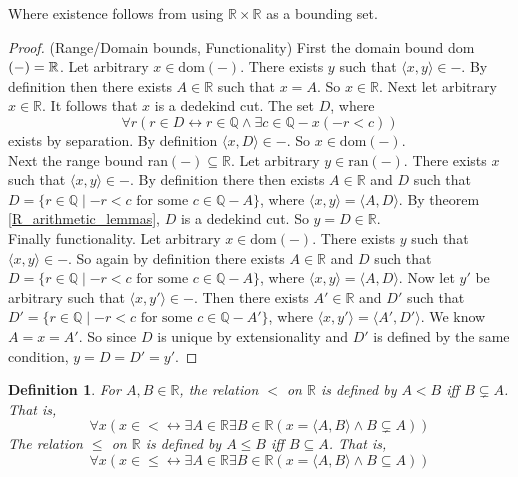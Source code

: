 \documentclass{report}
\newtheorem{definition}[theo]{Definition}
\begin{document}
\noindent Where existence follows from using $\mathbb R\times\mathbb R$ as a bounding set.
\begin{proof}(Range/Domain bounds, Functionality) First the domain bound dom$(-)\\=\mathbb R$. Let arbitrary $x\in\text{dom}(-)$. There exists
$y$ such that $\langle x,y\rangle\in-$. By definition then there exists $A\in\mathbb R$ such that $x=A$. So $x\in\mathbb R$. 
Next let arbitrary $x\in\mathbb R$. It follows that $x$ is a dedekind cut. The set $D$, where
\begin{equation*}
\forall r(r\in D\leftrightarrow r\in\mathbb Q\land\exists c\in\mathbb Q-x(-r<c))
\end{equation*}
exists by separation. By definition $\langle x,D\rangle\in-$. So $x\in\text{dom}(-)$.\\
\indent Next the range bound ran$(-)\subseteq\mathbb R$. Let arbitrary $y\in\text{ran}(-)$. There exists $x$ such that 
$\langle x,y\rangle\in-$. By definition there then exists $A\in\mathbb R$ and $D$ such that 
$D=\{r\in\mathbb Q\mid-r<c\text{ for some }c\in\mathbb Q-A\}$, where $\langle x,y\rangle=\langle A,D\rangle$. 
By theorem \ref{R_arithmetic_lemmas}, $D$ is a dedekind cut. So $y=D\in\mathbb R$.\\
\indent Finally functionality. Let arbitrary $x\in\text{dom}(-)$. There exists $y$ such that $\langle x,y\rangle\in-$. 
So again by definition there exists $A\in\mathbb R$ and $D$ such that $D=\{r\in\mathbb Q\mid-r<c\text{ for some }c\in\mathbb Q-A\}$, where 
$\langle x,y\rangle=\langle A,D\rangle$.
Now let $y'$ be arbitrary such that $\langle x,y'\rangle\in-$. Then there exists $A'\in\mathbb R$ and $D'$ such that 
$D'=\{r\in\mathbb Q\mid-r<c\text{ for some }c\in\mathbb Q-A'\}$, where $\langle x,y'\rangle=\langle A',D'\rangle$. 
We know $A=x=A'$. 
So since $D$ is unique by extensionality and $D'$ is defined by the same condition, 
$y=D=D'=y'$.
\end{proof}
\begin{definition}
For $A,B\in\mathbb R$, the relation $<$ on $\mathbb R$ is defined by $A<B$ iff $B\subsetneq A$. That is,
\begin{equation*}
\forall x(x\in<\leftrightarrow\exists A\in\mathbb R\exists B\in\mathbb R(x=\langle A,B\rangle\land B\subsetneq A))
\end{equation*}
The relation $\leq$ on $\mathbb R$ is defined by $A\leq B$ iff $B\subseteq A$. That is,
\begin{equation*}
\forall x(x\in\leq\leftrightarrow\exists A\in\mathbb R\exists B\in\mathbb R(x=\langle A,B\rangle\land B\subseteq A))
\end{equation*}
\end{definition}
\end{document}
